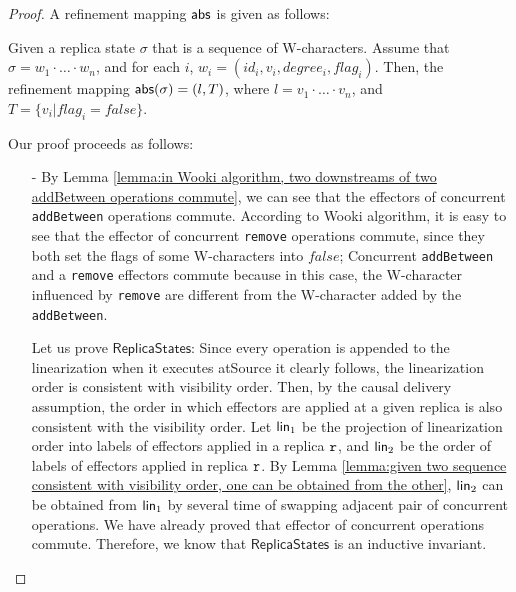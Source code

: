 \begin {proof}

A refinement mapping $\mathsf{abs}$ is given as follows:

Given a replica state $\sigma$ that is a sequence of W-characters. Assume that $\sigma = w_1 \cdot \ldots \cdot w_n$, and for each $i$, $w_i = (id_i,v_i,degree_i,flag_i)$. Then, the refinement mapping $\mathsf{abs}(\sigma) = (l,T)$, where $l = v_1 \cdot \ldots \cdot v_n$, and $T = \{ v_i \vert flag_i = \mathit{false} \}$.

Our proof proceeds as follows:

\begin{itemize}
\setlength{\itemsep}{0.5pt}
\item[-] By Lemma \ref{lemma:in Wooki algorithm, two downstreams of two addBetween operations commute}, we can see that the effectors of concurrent {\tt addBetween} operations commute. According to Wooki algorithm, it is easy to see that the effector of concurrent {\tt remove} operations commute, since they both set the flags of some W-characters into $\mathit{false}$; Concurrent {\tt addBetween} and a {\tt remove} effectors commute because in this case, the W-character influenced by {\tt remove} are different from the W-character added by the {\tt addBetween}.

    Let us prove $\mathsf{ReplicaStates}$: Since every operation is appended to the linearization when it executes atSource it clearly follows, the linearization order is consistent with visibility order. Then, by the causal delivery assumption, the order in which effectors are applied at a given replica is also consistent with the visibility order. Let $\mathsf{lin}_1$ be the projection of linearization order into labels of effectors applied in a replica $\mathtt{r}$, and $\mathsf{lin}_2$ be the order of labels of effectors applied in replica $\mathtt{r}$. By Lemma \ref{lemma:given two sequence consistent with visibility order, one can be obtained from the other}, $\mathsf{lin}_2$ can be obtained from $\mathsf{lin}_1$ by several time of swapping adjacent pair of concurrent operations. We have already proved that effector of concurrent operations commute. Therefore, we know that $\mathsf{ReplicaStates}$ is an inductive invariant.


\end{itemize}
\end{proof}
